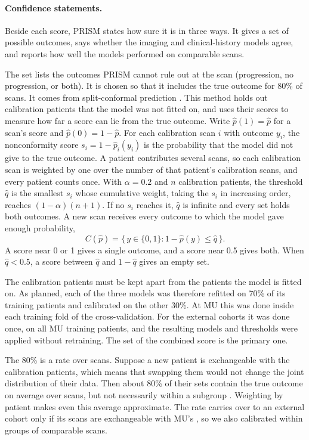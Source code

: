 \paragraph*{Confidence statements.} Beside each score, PRISM states how sure it is in three ways. It gives a set of
possible outcomes, says whether the imaging and clinical-history models agree, and reports how well the models
performed on comparable scans.

The set lists the outcomes PRISM cannot rule out at the scan (progression, no progression, or both). It is chosen so
that it includes the true outcome for 80\% of scans. It comes from split-conformal prediction
\citep{angelopoulos2023}. This method holds out calibration patients that the model was not fitted on, and uses their
scores to measure how far a score can lie from the true outcome. Write $\hat p(1) = \hat p$ for a scan's score and
$\hat p(0) = 1 - \hat p$. For each calibration scan $i$ with outcome $y_i$, the nonconformity score
$s_i = 1 - \hat p_i(y_i)$ is the probability that the model did not give to the true outcome. A patient contributes
several scans, so each calibration scan is weighted by one over the number of that patient's calibration scans, and
every patient counts once. With $\alpha = 0.2$ and $n$ calibration patients, the threshold $\hat q$ is the smallest
$s_i$ whose cumulative weight, taking the $s_i$ in increasing order, reaches $(1 - \alpha)(n + 1)$. If no $s_i$ reaches
it, $\hat q$ is infinite and every set holds both outcomes. A new scan receives every outcome to which the model gave
enough probability,
\begin{equation}
C(\hat p) = \{\, y \in \{0, 1\} : 1 - \hat p(y) \le \hat q \,\}.
\end{equation}
A score near 0 or 1 gives a single outcome, and a score near 0.5 gives both. When $\hat q < 0.5$, a score between
$\hat q$ and $1 - \hat q$ gives an empty set.

The calibration patients must be kept apart from the patients the model is fitted on. As planned, each of the three
models was therefore refitted on 70\% of its training patients and calibrated on the other 30\%. At MU this was done
inside each training fold of the cross-validation. For the external cohorts it was done once, on all MU training
patients, and the resulting models and thresholds were applied without retraining. The set of the combined score is
the primary one.

The 80\% is a rate over scans. Suppose a new patient is exchangeable with the calibration patients, which means that
swapping them would not change the joint distribution of their data. Then about 80\% of their sets contain the true
outcome on average over scans, but not necessarily within a subgroup \citep{romano2020,barber2021limits}. Weighting by
patient makes even this average approximate. The rate carries over to an external cohort only if its scans are
exchangeable with MU's \citep{mehrtens2023}, so we also calibrated within groups of comparable scans.

